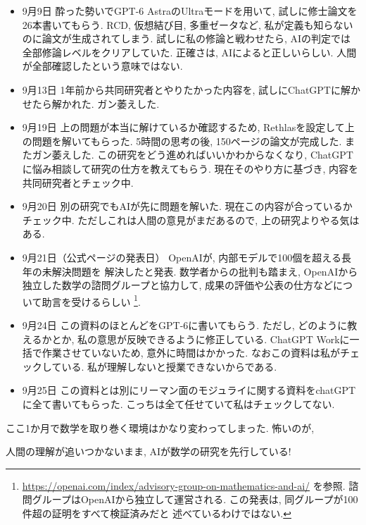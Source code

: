 \documentclass[dvipdfmx,a4paper,11pt]{article} %
\theoremstyle{definition}
\numberwithin{equation}{section}
\begin{document}
\begin{itemize}
  \item
9月9日
\quad
  酔った勢いでGPT-6 AstraのUltraモードを用いて,
  試しに修士論文を26本書いてもらう.
  RCD, 仮想結び目, 多重ゼータなど,
  私が定義も知らないのに論文が生成されてしまう.
  試しに私の修論と戦わせたら,
  AIの判定では全部修論レベルをクリアしていた.
  正確さは, AIによると正しいらしい.
  人間が全部確認したという意味ではない.


  \item
9月13日\quad
  1年前から共同研究者とやりたかった内容を,
  試しにChatGPTに解かせたら解かれた.
  ガン萎えした.

  \item
9月19日
\quad
  上の問題が本当に解けているか確認するため,
  Rethlasを設定して上の問題を解いてもらった.
  5時間の思考の後, 150ページの論文が完成した.
  またガン萎えした.
  この研究をどう進めればいいかわからなくなり,
  ChatGPTに悩み相談して研究の仕方を教えてもらう.
  現在そのやり方に基づき, 内容を共同研究者とチェック中.

  \item
9月20日\quad
  別の研究でもAIが先に問題を解いた.
  現在この内容が合っているかチェック中.
  ただしこれは人間の意見がまだあるので,
  上の研究よりやる気はある.

\newpage

  \item
9月21日（公式ページの発表日）
  OpenAIが, 内部モデルで100個を超える長年の未解決問題を
  解決したと発表.
  数学者からの批判も踏まえ,
  OpenAIから独立した数学の諮問グループと協力して,
  成果の評価や公表の仕方などについて助言を受けるらしい%
  \footnote{\url{https://openai.com/index/advisory-group-on-mathematics-and-ai/}
  を参照. 諮問グループはOpenAIから独立して運営される.
  この発表は, 同グループが100件超の証明をすべて検証済みだと
  述べているわけではない.}.

  \item
9月24日
\quad
  この資料のほとんどをGPT-6に書いてもらう.
  ただし, どのように教えるかとか,
  私の意思が反映できるように修正している.
  ChatGPT Workに一括で作業させていないため,
  意外に時間はかかった. なおこの資料は私がチェックしている. 私が理解しないと授業できないからである. 
  
 \item
9月25日
\quad この資料とは別にリーマン面のモジュライに関する資料をchatGPTに全て書いてもらった. こっちは全て任せていて私はチェックしてない. 
\end{itemize}

ここ1か月で数学を取り巻く環境はかなり変わってしまった.
怖いのが, 
\begin{tcolorbox}[mybox]
\begin{center}
人間の理解が追いつかないまま,
AIが数学の研究を先行している!
\end{center}
\end{tcolorbox}
\end{document}
